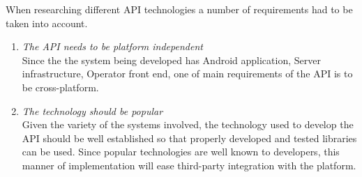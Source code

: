 \documentclass[]{article}
\begin{document}
When researching different API technologies a number of requirements had to be taken into account.
\begin{enumerate}
\item \textit{The API needs to be platform independent}\\
Since the the system being developed has Android application, Server infrastructure, Operator front end, one of main requirements of the API is to be cross-platform.

\item \textit{The technology should be popular}\\
Given the variety of the systems involved, the technology used to develop the API should be well established so that properly developed and tested libraries can be used.
Since popular technologies are well known to developers, this manner of implementation will ease third-party integration with the platform.
\end{enumerate}
\end{document}
